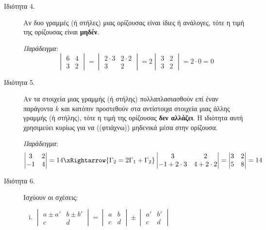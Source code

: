 \begin{description}
  \item[Ιδιότητα 4.] Αν δυο γραμμές (ή στήλες) μιας ορίζουσας είναι ίδιες ή ανάλογες, 
    τότε η τιμή της ορίζουσας είναι \textbf{μηδέν}.

    \textit{Παράδειγμα}: 
    \[
      \begin{vmatrix}
        6 & 4\\
        3 & 2 
        \end{vmatrix} = \begin{vmatrix}
        2\cdot 3 & 2\cdot 2\\
        3 & 2 
        \end{vmatrix} = 2\begin{vmatrix}
        3 & 2 \\
        3 & 2 
      \end{vmatrix}=2\cdot 0 = 0
    \]

  \item[Ιδιότητα 5.] Αν τα στοιχεία μιας γραμμής (ή στήλης) πολλαπλασιασθούν επί 
    έναν παράγοντα $k$ και κατόπιν προστεθούν στα αντίστοιχα στοιχεία μιας άλλης 
    γραμμής (ή στήλης), τότε η τιμή της ορίζουσας \textbf{δεν αλλάζει}. Η ιδιότητα 
    αυτή χρησιμεύει κυρίως για να ((φτιάχνω)) μηδενικά μέσα στην ορίζουσα.

    \textit{Παράδειγμα}:
    \[
      \begin{vmatrix}
        3 & 2\\
        -1 & 4
      \end{vmatrix}=14
      \xRightarrow{\Gamma_2=2\Gamma_1+\Gamma_2}\begin{vmatrix}
        3 & 2 \\
        -1 + 2\cdot 3 & 4 + 2\cdot 2 
        \end{vmatrix}=\begin{vmatrix}
        3 & 2\\
        5 & 8 
      \end{vmatrix}=14
    \]

  \item[Ιδιότητα 6.] Ισχύουν οι σχέσεις:
    \begin{enumerate}[i)]

      \item $
        \begin{vmatrix}
          a\pm a' & b\pm b'\\
          c & d 
        \end{vmatrix}
        =
        \begin{vmatrix}
          a & b \\
          c & d 
        \end{vmatrix}
        \pm
        \begin{vmatrix}
          a' & b' \\
          c & d 
        \end{vmatrix}
        $


\end{enumerate}
\end{description}
